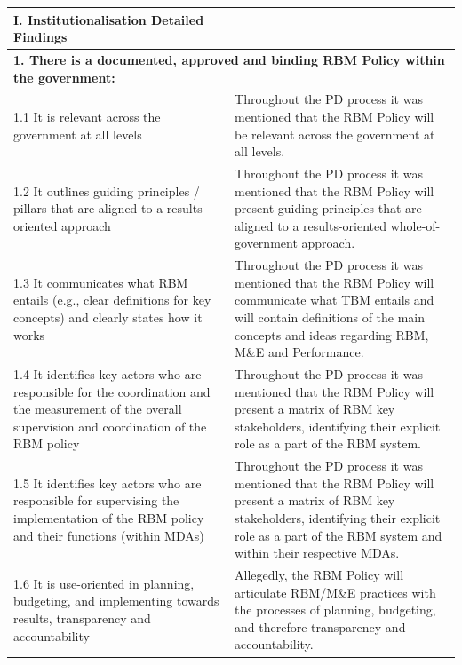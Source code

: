\documentclass[
  10pt,
]{book}
\begin{document}
\begin{table}
\centering
\begin{tabular}[t]{l|l}
\hline
I. Institutionalisation Detailed Findings &  \\
\hline
\multicolumn{2}{l}{\textbf{1. There is a documented, approved and binding RBM Policy within the government:}}\\
\hline
\hspace{1em}1.1 It is relevant across the government at all levels & Throughout the PD process it was mentioned that the RBM Policy will be relevant across the government at all levels.\\
\hline
\hspace{1em}1.2 It outlines guiding principles / pillars that are aligned to a results-oriented approach & Throughout the PD process it was mentioned that the RBM Policy will present guiding principles that are aligned to a results-oriented whole-of-government approach.\\
\hline
\hspace{1em}1.3 It communicates what RBM entails (e.g., clear definitions for key concepts) and clearly states how it works & Throughout the PD process it was mentioned that the RBM Policy will communicate what TBM entails and will contain definitions of the main concepts and ideas regarding RBM, M\&E and Performance.\\
\hline
\hspace{1em}1.4 It identifies key actors who are responsible for the coordination and the measurement of the overall supervision and coordination of the RBM policy & Throughout the PD process it was mentioned that the RBM Policy will present a matrix of RBM key stakeholders, identifying their explicit role as a part of the RBM system.\\
\hline
\hspace{1em}1.5 It identifies key actors who are responsible for supervising the implementation of the RBM policy and their functions (within MDAs) & Throughout the PD process it was mentioned that the RBM Policy will present a matrix of RBM key stakeholders, identifying their explicit role as a part of the RBM system and within their respective MDAs.\\
\hline
\hspace{1em}1.6 It is use-oriented in planning, budgeting, and implementing towards results, transparency and accountability & Allegedly, the RBM Policy will articulate RBM/M\&E practices with the processes of planning, budgeting, and therefore transparency and accountability.\\

\end{tabular}
\end{table}
\end{document}
